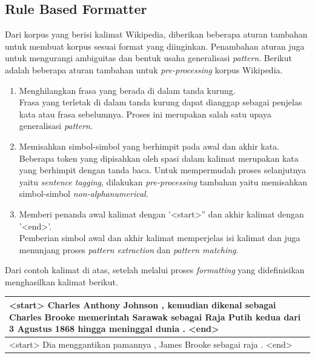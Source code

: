 \subsection{Rule Based Formatter}
Dari korpus yang berisi kalimat Wikipedia, diberikan beberapa aturan tambahan untuk membuat korpus sesuai format yang diinginkan. Penambahan aturan juga untuk mengurangi ambiguitas dan bentuk usaha generalisasi \textit{pattern}. Berikut adalah beberapa aturan tambahan untuk \textit{pre-processing} korpus Wikipedia.
\begin{enumerate}
  \item Menghilangkan frasa yang berada di dalam tanda kurung. \\
  Frasa yang terletak di dalam tanda kurung dapat dianggap sebagai penjelas kata atau frasa sebelumnya. Proses ini merupakan salah satu upaya generalisasi \textit{pattern}.
  \item Memisahkan simbol-simbol yang berhimpit pada awal dan akhir kata. \\
  Beberapa token yang dipisahkan oleh spasi dalam kalimat merupakan kata yang berhimpit dengan tanda baca. Untuk mempermudah proses selanjutnya yaitu \textit{sentence tagging}, dilakukan \textit{pre-processing} tambahan yaitu memisahkan simbol-simbol \textit{non-alphanumerical}.
  \item Memberi penanda awal kalimat dengan '<start>'' dan akhir kalimat dengan '<end>'. \\
  Pemberian simbol awal dan akhir kalimat memperjelas isi kalimat dan juga menunjang proses \textit{pattern extraction} dan \textit{pattern matching}.
\end{enumerate}

\noindent Dari contoh kalimat di atas, setelah melalui proses \textit{formatting} yang didefinisikan menghasilkan kalimat berikut.
\begin{center}
\begin{tabular}{ | m{32em} | } 
\hline
<start> Charles Anthony Johnson , kemudian dikenal sebagai Charles Brooke memerintah Sarawak sebagai Raja Putih kedua dari 3 Agustus 1868 hingga meninggal dunia . <end> \\
\hline 
<start> Dia menggantikan pamannya , James Brooke sebagai raja . <end> \\
\hline
\end{tabular}
\end{center}


